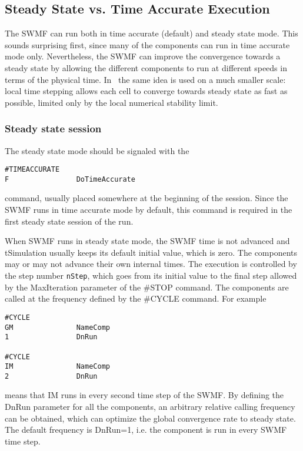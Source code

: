 \subsection{Steady State vs. Time Accurate Execution}

The SWMF can run both in time accurate (default) and
steady state mode. This sounds surprising first, 
since many of the components can run in time accurate 
mode only. Nevertheless, the SWMF can improve the convergence
towards a steady state by allowing the different components
to run at different speeds in terms of the physical time.
In \BATSRUS\ the same idea is used on a much smaller scale:
local time stepping allows each cell to converge towards
steady state as fast as possible, limited only by the local
numerical stability limit.

\subsubsection{Steady state session}

The steady state mode should be signaled with the 
\begin{verbatim}
#TIMEACCURATE
F                DoTimeAccurate
\end{verbatim}
command, usually placed somewhere at the beginning of the session.
Since the SWMF runs in time accurate mode by default,
this command is required in the first steady state session of the run.

When SWMF runs in steady state mode, the SWMF time is not
advanced and tSimulation usually keeps its default initial value,
which is zero. 
The components may or may not advance their own
internal times. The execution is controlled by the 
step number {\tt nStep}, which goes from its initial value 
to the final step allowed by the MaxIteration parameter
of the \#STOP command. The components are called at
the frequency defined by the \#CYCLE command. For example
\begin{verbatim}
#CYCLE
GM               NameComp
1                DnRun

#CYCLE
IM               NameComp
2                DnRun
\end{verbatim}
means that IM runs in every second time step of the SWMF.
By defining the DnRun parameter for all the components,
an arbitrary relative calling frequency can be obtained,
which can optimize the global convergence rate to steady state.
The default frequency is DnRun=1, i.e. the component is
run in every SWMF time step. 

